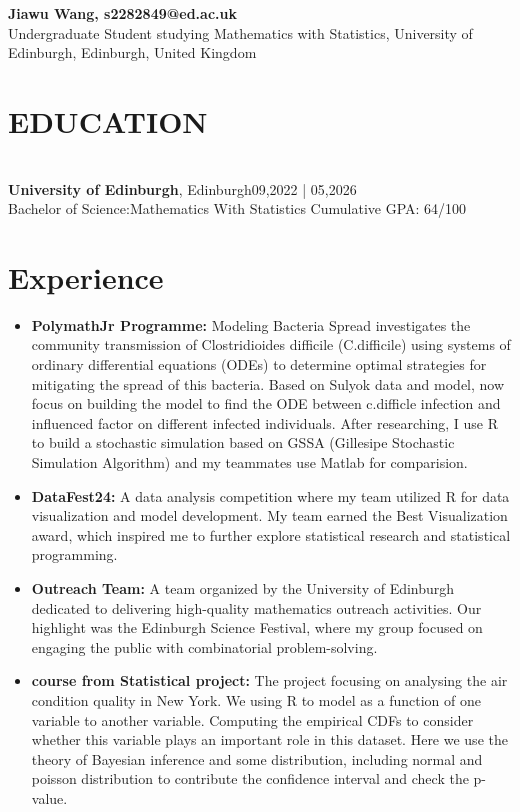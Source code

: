 \documentclass[a4paper,9pt]{extarticle}
\begin{document}
\pagestyle{fancy}
\renewcommand{\headrulewidth}{0pt}
\fancyhead{}
\thispagestyle{empty} %

\begin{flushleft}
\textbf{\LARGE  Jiawu Wang, {s2282849@ed.ac.uk}}\\[2pt] %
Undergraduate Student studying Mathematics with Statistics, University of Edinburgh, Edinburgh, United Kingdom
\end{flushleft}

\section*{EDUCATION}
\noindent\\
\textbf{University of Edinburgh},  Edinburgh\hfill 09,2022  | 05,2026 \\ %
Bachelor of Science:Mathematics With Statistics \hfill Cumulative GPA: 64/100 %


\section{Experience}
\noindent
\begin{itemize}
    \item\textbf{PolymathJr Programme:}
Modeling Bacteria Spread investigates the community transmission of Clostridioides difficile (C.difficile) using systems of ordinary differential equations (ODEs) to determine optimal strategies for mitigating the spread of this bacteria. Based on Sulyok data and model, now focus on building the model to find the ODE between c.difficle infection and influenced factor on different infected individuals. After researching, I use R to build a stochastic simulation based on GSSA (Gillesipe Stochastic Simulation Algorithm) and my teammates use Matlab for comparision.
    \item \textbf{DataFest24:}
A data analysis competition where my team utilized R for data visualization and model development. My team earned the Best Visualization award, which inspired me to further explore statistical research and statistical programming.
    \item \textbf{Outreach Team:}
A team organized by the University of Edinburgh dedicated to delivering high-quality mathematics outreach activities. Our highlight was the Edinburgh Science Festival, where my group focused on engaging the public with combinatorial problem-solving.
    \item\textbf{course from Statistical project:}
The project focusing on analysing the air condition quality in New York. We using R to model as a function of one variable to another variable. Computing the empirical CDFs to consider whether this variable plays an important role in this dataset. Here we use the theory of Bayesian inference and some distribution, including normal and poisson distribution to contribute the confidence interval and check the p-value.
\end{itemize}
\end{document}
